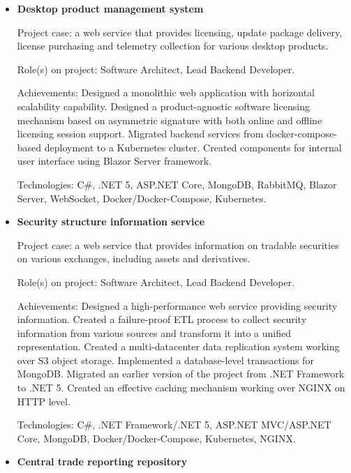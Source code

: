 \documentclass{article}
\begin{document}
\begin{itemize}
{        Technologies: C\#, .NET Framework, ASP.NET MVC, MS SQL Server, IIS, AngularJS, Typescript, SignalR, CryptoPRO crypto provider.
    }
    \item {
        \textbf{Desktop product management system}
        
        Project case: a web service that provides licensing, update package delivery, license purchasing and telemetry collection for various desktop products.
        
        Role(s) on project: Software Architect, Lead Backend Developer.
        
        Achievements:
        Designed a monolithic web application with horizontal scalability capability.
        Designed a product-agnostic software licensing mechanism based on asymmetric signature with both online and offline licensing session support.
        Migrated backend services from docker-compose-based deployment to a Kubernetes cluster.
        Created components for internal user interface using Blazor Server framework.
        
        Technologies: C\#, .NET 5, ASP.NET Core, MongoDB, RabbitMQ, Blazor Server, WebSocket, Docker/Docker-Compose, Kubernetes.
    }
    \item {
        \textbf{Security structure information service}
        
        Project case: a web service that provides information on tradable securities on various exchanges, including assets and derivatives.
        
        Role(s) on project: Software Architect, Lead Backend Developer.
        
        Achievements:
        Designed a high-performance web service providing security information.
        Created a failure-proof ETL process to collect security information from various sources and transform it into a unified representation. 
        Created a multi-datacenter data replication system working over S3 object storage.
        Implemented a database-level transactions for MongoDB.
        Migrated an earlier version of the project from .NET Framework to .NET 5.
        Created an effective caching mechanism working over NGINX on HTTP level.
        
        Technologies: C\#, .NET Framework/.NET 5, ASP.NET MVC/ASP.NET Core, MongoDB,  Docker/Docker-Compose, Kubernetes, NGINX.
    }
    \item {
        \textbf{Central trade reporting repository}
        
}
\end{itemize}
\end{document}
